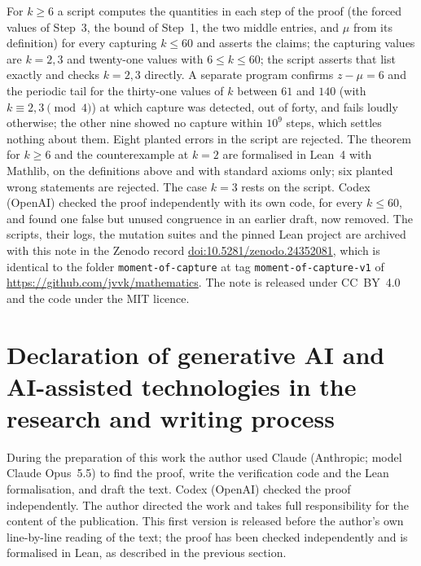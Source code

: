 \documentclass[11pt]{amsart}
\theoremstyle{definition}
\begin{document}
For $k\ge6$ a script computes the quantities in each step of the proof (the forced values of Step~3, the bound of Step~1,
the two middle entries, and $\mu$ from its definition) for every capturing $k\le60$ and asserts the claims; the
capturing values are $k=2,3$ and twenty-one values with $6\le k\le60$; the script asserts that list exactly and
checks $k=2,3$ directly.
A separate program confirms $z-\mu=6$ and the periodic tail for the thirty-one values of $k$ between $61$ and
$140$ (with $k\equiv2,3\pmod4$) at which capture was detected, out of forty, and fails loudly otherwise; the
other nine showed no capture within $10^9$ steps, which settles nothing about them. Eight planted errors in the script are rejected. The theorem for
$k\ge6$ and the counterexample at $k=2$ are formalised in Lean~4 with Mathlib, on the definitions above and with
standard axioms only; six planted wrong statements are rejected. The case $k=3$ rests on the script. Codex (OpenAI) checked the proof independently with its own code, for every $k\le60$, and found one
false but unused congruence in an earlier draft, now removed. The scripts, their logs, the mutation suites and the pinned Lean project are archived with this note in the
Zenodo record \href{https://doi.org/10.5281/zenodo.24352081}{doi:10.5281/zenodo.24352081}, which is identical to
the folder \texttt{moment-of-capture} at tag \texttt{moment-of-capture-v1} of
\url{https://github.com/jvvk/mathematics}. The note is released under CC~BY~4.0 and the code under the MIT licence.

\section*{Declaration of generative AI and AI-assisted technologies in the research and writing process}
During the preparation of this work the author used Claude (Anthropic; model Claude Opus~5.5) to find the proof,
write the verification code and the Lean formalisation, and draft the text. Codex (OpenAI) checked the proof
independently. The author directed the work and takes full responsibility for the content of the publication.
This first version is released before the author's own line-by-line reading of the text; the proof has been
checked independently and is formalised in Lean, as described in the previous section.
\end{document}
